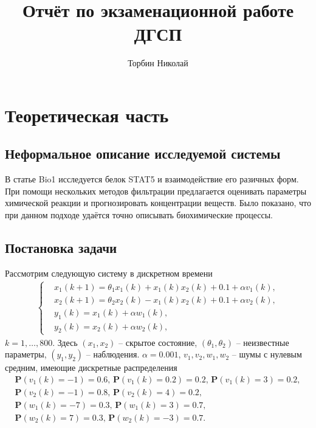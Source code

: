 \documentclass[a4paper,12pt]{article}
\title{Отчёт по экзаменационной работе ДГСП}
\author{Торбин Николай}
\date{}
\begin{document}
\maketitle

\section{Теоретическая часть}
\subsection{Неформальное описание исследуемой системы}
В статье Bio1 исследуется белок STAT5 и взаимодействие его разичных форм. При помощи нескольких методов фильтрации предлагается оценивать параметры химической реакции и прогнозировать концентрации веществ. Было показано, что при данном подходе удаётся точно описывать биохимические процессы.

\subsection{Постановка задачи}
Рассмотрим следующую систему в дискретном времени
\begin{gather}\label{sys0}
    \left\{
    \begin{aligned}
        & x_1(k+1) = \theta_1 x_1(k) + x_1(k) x_2(k) + 0.1 + \alpha v_1(k),\\
        & x_2(k+1) = \theta_2 x_2(k) - x_1(k) x_2(k) + 0.1 + \alpha v_2(k),\\
        & y_1(k) = x_1(k) + \alpha w_1(k), \\
        & y_2(k) = x_2(k) + \alpha w_2(k),
    \end{aligned}
    \right.
\end{gather}
$k = 1, \dots, 800$. Здесь $(x_1, x_2)$ -- скрытое состояние, $(\theta_1, \theta_2)$ -- неизвестные параметры, $(y_1, y_2)$ -- наблюдения. $\alpha = 0.001$, $v_1, v_2, w_1, w_2$ -- шумы с нулевым средним, имеющие дискретные распределения
\begin{gather*}
    \mathbf{P}(v_1(k) = -1) = 0.6,\,  \mathbf{P}(v_1(k) = 0.2) = 0.2,\, \mathbf{P}(v_1(k) = 3) = 0.2,\\
    \mathbf{P}(v_2(k) = -1) = 0.8,\, \mathbf{P}(v_2(k) = 4) = 0.2,\\
    \mathbf{P}(w_1(k) = -7) = 0.3,\, \mathbf{P}(w_1(k) = 3) = 0.7,\\
    \mathbf{P}(w_2(k) = 7) = 0.3,\, \mathbf{P}(w_2(k) = -3) = 0.7.
\end{gather*}
\end{document}
